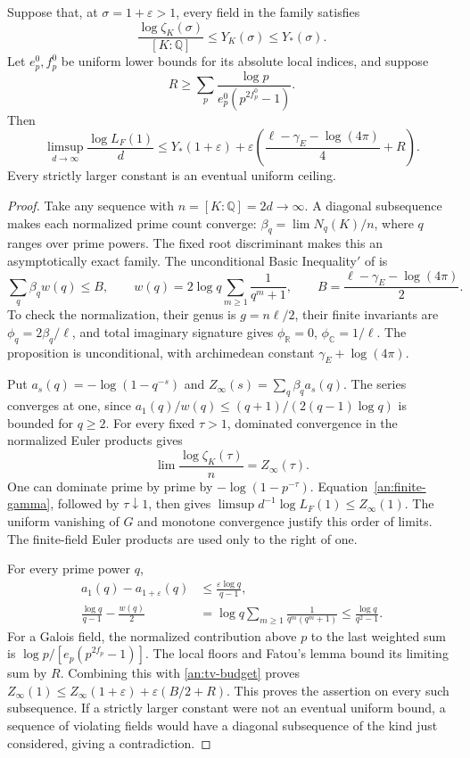 \begin{proposition}\label{an:prime-budget}
Suppose that, at $\sigma=1+\varepsilon>1$, every field in the family
satisfies
\[
 \frac{\log\zeta_K(\sigma)}{[K:\mathbb Q]}\leq Y_K(\sigma)
 \leq Y_*(\sigma).
\]
Let $e_p^0,f_p^0$ be uniform lower bounds for its absolute local indices,
and suppose
\[
 R\geq\sum_p\frac{\log p}{e_p^0(p^{2f_p^0}-1)}.
\]
Then
\begin{equation}\label{an:budget-conclusion}
 \limsup_{d\to\infty}\frac{\log L_F(1)}d
 \leq Y_*(1+\varepsilon)
 +\varepsilon\left(\frac{\ell-\gamma_E-\log(4\pi)}4+R\right).
\end{equation}
Every strictly larger constant is an eventual uniform ceiling.
\end{proposition}
\begin{proof}
Take any sequence with $n=[K:\mathbb Q]=2d\to\infty$. A diagonal
subsequence makes each normalized prime count converge:
$\beta_q=\lim N_q(K)/n$, where $q$ ranges over prime powers.
The fixed root discriminant makes this an asymptotically exact family.
The unconditional Basic Inequality$'$ of
\cite[Proposition 3.1]{TsfasmanVladut2002} is
\begin{equation}\label{an:tv-budget}
 \sum_q\beta_q w(q)\leq B,\qquad
 w(q)=2\log q\sum_{m\geq1}\frac1{q^m+1},\qquad
 B=\frac{\ell-\gamma_E-\log(4\pi)}2.
\end{equation}
To check the normalization, their genus is $g=n\ell/2$, their finite
invariants are $\phi_q=2\beta_q/\ell$, and total imaginary signature
gives $\phi_{\mathbb R}=0$, $\phi_{\mathbb C}=1/\ell$.
The proposition is unconditional, with archimedean constant
$\gamma_E+\log(4\pi)$.

Put $a_s(q)=-\log(1-q^{-s})$ and
$Z_\infty(s)=\sum_q\beta_q a_s(q)$. The series converges at one,
since $a_1(q)/w(q)\leq(q+1)/(2(q-1)\log q)$ is bounded for $q\geq2$.
For every fixed $\tau>1$, dominated convergence in the normalized
Euler products gives
\[
 \lim\frac{\log\zeta_K(\tau)}n=Z_\infty(\tau).
\]
One can dominate prime by prime by $-\log(1-p^{-\tau})$.
Equation~\eqref{an:finite-gamma}, followed by $\tau\downarrow1$,
then gives $\limsup d^{-1}\log L_F(1)\leq Z_\infty(1)$.
The uniform vanishing of $G$ and monotone convergence justify this
order of limits. The finite-field Euler products are used only to the
right of one.

For every prime power $q$,
\begin{align*}
 a_1(q)-a_{1+\varepsilon}(q)&\leq
                \frac{\varepsilon\log q}{q-1},\\
 \frac{\log q}{q-1}-\frac{w(q)}2
 &=\log q\sum_{m\geq1}\frac1{q^m(q^m+1)}
 \leq\frac{\log q}{q^2-1}.
\end{align*}
For a Galois field, the normalized contribution above $p$ to the last
weighted sum is $\log p/[e_p(p^{2f_p}-1)]$. The local floors and
Fatou's lemma bound its limiting sum by $R$. Combining this with
\eqref{an:tv-budget} proves
$Z_\infty(1)\leq Z_\infty(1+\varepsilon)+\varepsilon(B/2+R)$.
This proves the assertion on every such subsequence. If a strictly
larger constant were not an eventual uniform bound, a sequence of
violating fields would have a diagonal subsequence of the kind just
considered, giving a contradiction.
\end{proof}


